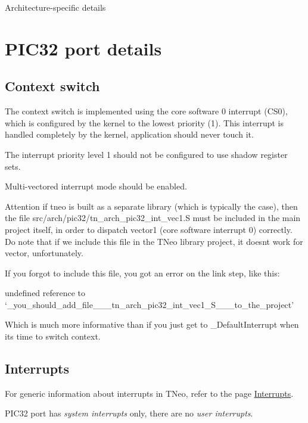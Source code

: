 Architecture-\/specific details\hypertarget{arch_specific_pic32_details}{}\section{P\+I\+C32 port details}\label{arch_specific_pic32_details}
\hypertarget{arch_specific_pic32_context_switch}{}\subsection{Context switch}\label{arch_specific_pic32_context_switch}
The context switch is implemented using the core software 0 interrupt ({\ttfamily C\+S0}), which is configured by the kernel to the lowest priority (1). This interrupt is handled completely by the kernel, application should never touch it.

The interrupt priority level 1 should not be configured to use shadow register sets.

Multi-\/vectored interrupt mode should be enabled.

\begin{DoxyAttention}{Attention}
if tneo is built as a separate library (which is typically the case), then the file {\ttfamily src/arch/pic32/tn\+\_\+arch\+\_\+pic32\+\_\+int\+\_\+vec1.\+S} must be included in the main project itself, in order to dispatch vector1 (core software interrupt 0) correctly. Do note that if we include this file in the T\+Neo library project, it doesn\textquotesingle{}t work for vector, unfortunately.

If you forgot to include this file, you got an error on the link step, like this\+: 
\begin{DoxyCode}
undefined reference to `\_you\_should\_add\_file\_\_\_tn\_arch\_pic32\_int\_vec1\_S\_\_\_to\_the\_project\textcolor{stringliteral}{'}
\end{DoxyCode}
 Which is much more informative than if you just get to {\ttfamily \+\_\+\+Default\+Interrupt} when it\textquotesingle{}s time to switch context.
\end{DoxyAttention}
\hypertarget{arch_specific_pic32_interrupts}{}\subsection{Interrupts}\label{arch_specific_pic32_interrupts}
For generic information about interrupts in T\+Neo, refer to the page \hyperlink{interrupts}{Interrupts}.

P\+I\+C32 port has {\itshape system interrupts} only, there are no {\itshape user interrupts}.

